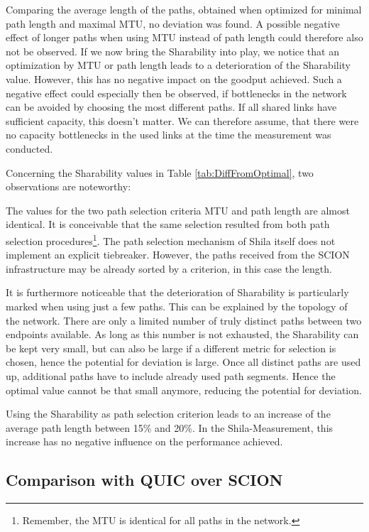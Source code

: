 Comparing the average length of the paths, obtained when optimized for minimal path length and maximal MTU, no deviation was found. A possible negative effect of longer paths when using MTU instead of path length could therefore also not be observed. If we now bring the Sharability into play, we notice that an optimization by MTU or path length leads to a deterioration of the Sharability value. However, this has no negative impact on the goodput achieved. Such a negative effect could especially then be observed,  if bottlenecks in the network can be avoided by choosing the most different paths. If all shared links have sufficient capacity, this doesn't matter. We can therefore assume, that there were no capacity bottlenecks in the used links at the time the measurement was conducted. 

Concerning the Sharability values in Table \ref{tab:DiffFromOptimal}, two observations are noteworthy:

The values for the two path selection criteria MTU and path length are almost identical. It is conceivable that the same selection resulted from both path selection procedures\footnote{Remember, the MTU is identical for all paths in the network.}. The path selection mechanism of Shila itself does not implement an explicit tiebreaker. However, the paths received from the SCION infrastructure may be already sorted by a criterion, in this case the length.

It is furthermore noticeable that the deterioration of Sharability is particularly marked when using just a few paths. This can be explained by the topology of the network. There are only a limited number of truly distinct paths between two endpoints available. As long as this number is not exhausted, the Sharability can be kept very small, but can also be large if a different metric for selection is chosen, hence the potential for deviation is large. Once all distinct paths are used up, additional paths have to include already used path segments. Hence the optimal value cannot be that small anymore, reducing the potential for deviation.

Using the Sharability as path selection criterion leads to an increase of the average path length between 15\% and 20\%. In the Shila-Measurement, this increase has no negative influence on the performance achieved. 

\subsection*{Comparison with QUIC over SCION}
\label{subsec:ComparisonWithQUIC}

